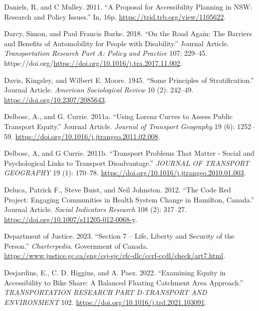 \documentclass[12pt, oneside]{report}
\newlength{\cslhangindent}
\newlength{\cslentryspacingunit} %
\newenvironment{CSLReferences}[2] %
 {%
  \setlength{\parindent}{0pt}
  \ifodd #1
  \let\oldpar\par
  \def\par{\hangindent=\cslhangindent\oldpar}
  \fi
  \setlength{\parskip}{#2\cslentryspacingunit}
 }%
 {}
\begin{document}
\begin{CSLReferences}{1}{0}
\leavevmode{}%
Daniels, R, and C Mulley. 2011. {``A Proposal for Accessibility Planning
in {NSW}: Research and Policy Issues.''} In, 16p.
\url{https://trid.trb.org/view/1105622}.

\leavevmode{}%
Darcy, Simon, and Paul Francis Burke. 2018. {``On the Road Again: The
Barriers and Benefits of Automobility for People with Disability.''}
Journal Article. \emph{Transportation Research Part A: Policy and
Practice} 107: 229--45.
https://doi.org/\url{https://doi.org/10.1016/j.tra.2017.11.002}.

\leavevmode{}%
Davis, Kingsley, and Wilbert E. Moore. 1945. {``Some Principles of
Stratification.''} Journal Article. \emph{American Sociological Review}
10 (2): 242--49. \url{https://doi.org/10.2307/2085643}.

\leavevmode{}%
Delbosc, A., and G. Currie. 2011a. {``Using Lorenz Curves to Assess
Public Transport Equity.''} Journal Article. \emph{Journal of Transport
Geography} 19 (6): 1252--59.
\url{https://doi.org/10.1016/j.jtrangeo.2011.02.008}.

\leavevmode{}%
Delbosc, A, and G Currie. 2011b. {``Transport Problems That Matter -
Social and Psychological Links to Transport Disadvantage.''}
\emph{JOURNAL OF TRANSPORT GEOGRAPHY} 19 (1): 170--78.
\url{https://doi.org/10.1016/j.jtrangeo.2010.01.003}.

\leavevmode{}%
Deluca, Patrick F., Steve Buist, and Neil Johnston. 2012. {``The Code
Red Project: Engaging Communities in Health System Change in Hamilton,
Canada.''} Journal Article. \emph{Social Indicators Research} 108 (2):
317--27. \url{https://doi.org/10.1007/s11205-012-0068-y}.

\leavevmode{}%
Department of Justice. 2023. {``Section 7 -- Life, Liberty and Security
of the Person.''} \emph{Charterpedia}. Government of Canada.
\url{https://www.justice.gc.ca/eng/csj-sjc/rfc-dlc/ccrf-ccdl/check/art7.html}.

\leavevmode{}%
Desjardins, E., C. D. Higgins, and A. Paez. 2022. {``Examining Equity in
Accessibility to Bike Share: {A} Balanced Floating Catchment Area
Approach.''} \emph{TRANSPORTATION RESEARCH PART D-TRANSPORT AND
ENVIRONMENT} 102. \url{https://doi.org/10.1016/j.trd.2021.103091}.


\end{CSLReferences}
\end{document}
